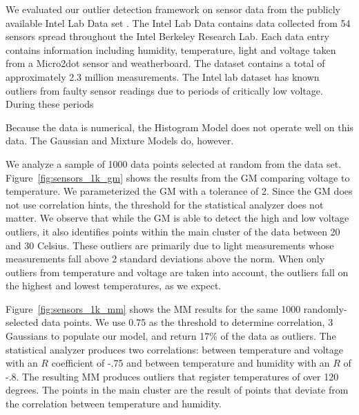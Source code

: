 
We evaluated our outlier detection framework on sensor data from the publicly available Intel Lab Data set \cite{IntelLabData}.
The Intel Lab Data contains data collected from 54 sensors spread throughout the Intel Berkeley Research Lab.
Each data entry contains information including humidity, temperature, light and voltage taken from a Micro2dot sensor and weatherboard.
The dataset contains a total of approximately 2.3 million measurements.
The Intel lab dataset has known outliers from faulty sensor readings due to periods of critically low voltage.
During these periods 

Because the data is numerical, the Histogram Model does not operate well on this data.
The Gaussian and Mixture Models do, however.

We analyze a sample of 1000 data points selected at random from the data set.
Figure~\ref{fig:sensors_1k_gm} shows the results from the GM comparing voltage to temperature.
We parameterized the GM with a tolerance of 2.
Since the GM does not use correlation hints, the threshold for the statistical analyzer does not matter.
We observe that while the GM is able to detect the high and low voltage outliers, it also identifies points within the main cluster of the data between 20 and 30 Celsius.
These outliers are primarily due to light measurements whose measurements fall above 2 standard deviations above the norm.
When only outliers from temperature and voltage are taken into account, the outliers fall on the highest and lowest temperatures, as we expect.

Figure~\ref{fig:sensors_1k_mm} shows the MM results for the same 1000 randomly-selected data points.
We use 0.75 as the threshold to determine correlation, 3 Gaussians to populate our model, and return 17\% of the data as outliers.
The statistical analyzer produces two correlations: between temperature and voltage with an $R$ coefficient of -.75 and between temperature and humidity with an $R$ of -.8.
The resulting MM produces outliers that register temperatures of over 120 degrees.
The points in the main cluster are the result of points that deviate from the correlation between temperature and humidity.

